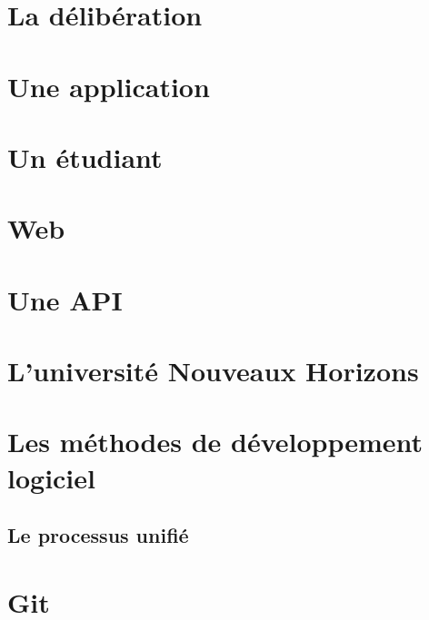    \section{La délibération}\label{subsec:deliberation}
    

    \section{Une application}\label{subsec:application}
    

    \section{Un étudiant}\label{subsec:etudiants}


\section{Web}\label{subsec:web}


\section{Une API}\label{subsec:api}


\section{L'université Nouveaux Horizons}\label{subsec:unh}


\section{Les méthodes de développement logiciel}\label{subsec:methode-de-developpement-logiciel}


\subsection{Le processus unifié}\label{subsec:processus-unifie}


\section{Git}\label{sec:git-1}


